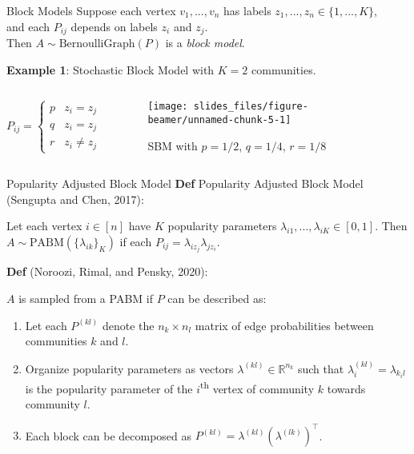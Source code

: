 \documentclass[
  ignorenonframetext,
]{beamer}
\providecommand{\tightlist}{%
  \setlength{\itemsep}{0pt}\setlength{\parskip}{0pt}}
\begin{document}
\begin{frame}{Block Models}
\protect\hypertarget{block-models}{}
Suppose each vertex \(v_1, ..., v_n\) has labels
\(z_1, ..., z_n \in \{1, ..., K\}\),\\
and each \(P_{ij}\) depends on labels \(z_i\) and \(z_j\).\\
Then \(A \sim \text{BernoulliGraph}(P)\) is a \emph{block model}.

\textbf{Example 1}: Stochastic Block Model with \(K=2\) communities.

\begin{columns}[T]
\begin{column}{0.48\textwidth}
\(P_{ij} = \begin{cases} p & z_i = z_j = 1 \\ q & z_i = z_j = 2 \\ r & z_i \neq z_j \end{cases}\)
\end{column}

\begin{column}{0.48\textwidth}
\begin{figure}

{\centering \texttt{[image: slides\_files/figure-beamer/unnamed-chunk-5-1]} 

}

\caption{SBM with $p=1/2$, $q=1/4$, $r=1/8$}\label{unnamed-chunk-5}
\end{figure}
\end{column}
\end{columns}
\end{frame}

\begin{frame}{Popularity Adjusted Block Model}
\protect\hypertarget{popularity-adjusted-block-model}{}
\textbf{Def} Popularity Adjusted Block Model (Sengupta and Chen, 2017):

Let each vertex \(i \in [n]\) have \(K\) popularity parameters
\(\lambda_{i1}, ..., \lambda_{iK} \in [0, 1]\). Then
\(A \sim \text{PABM}(\{\lambda_{ik}\}_K)\) if each
\(P_{ij} = \lambda_{i z_j} \lambda_{j z_i}\).

\textbf{Def} (Noroozi, Rimal, and Pensky, 2020):

\(A\) is sampled from a PABM if \(P\) can be described as:

\begin{enumerate}
\tightlist
\item
  Let each \(P^{(kl)}\) denote the \(n_k \times n_l\) matrix of edge
  probabilities between communities \(k\) and \(l\).
\item
  Organize popularity parameters as vectors
  \(\lambda^{(kl)} \in \mathbb{R}^{n_k}\) such that
  \(\lambda^{(kl)}_i = \lambda_{k_i l}\) is the popularity parameter of
  the \(i\)\textsuperscript{th} vertex of community \(k\) towards
  community \(l\).
\item
  Each block can be decomposed as
  \(P^{(kl)} = \lambda^{(kl)} (\lambda^{(lk)})^\top\).
\end{enumerate}
\end{frame}
\end{document}
